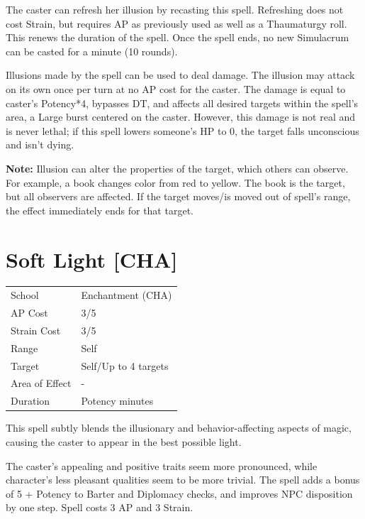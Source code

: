 \documentclass[11pt,a4paper,twocolumn]{book}
\begin{document}
The caster can refresh her illusion by recasting this spell. Refreshing does not cost Strain, but requires AP as previously used as well as a Thaumaturgy roll. This renews the duration of the spell. Once the spell ends, no new Simulacrum can be casted for a minute (10 rounds).

Illusions made by the spell can be used to deal damage. The illusion may attack on its own once per turn at no AP cost for the caster. The damage is equal to caster's Potency*4, bypasses DT, and affects all desired targets within the spell's area, a Large burst centered on the caster. However, this damage is not real and is never lethal; if this spell lowers someone's HP to 0, the target falls unconscious and isn't dying.

\textbf{Note:} Illusion can alter the properties of the target, which others can observe. For example, a book changes color from red to yellow. The book is the target, but all observers are affected. If the target moves/is moved out of spell's range, the effect immediately ends for that target.


\section*{Soft Light [CHA]}
{
	\begin{tabu} to 75mm{| X[l,4] | X[l,7] |}
		\hline
		School 			& Enchantment (CHA) 	\\
        AP Cost	      	& 3/5 					\\
        Strain Cost     & 3/5 					\\
        Range     		& Self					\\
        Target      	& Self/Up to 4 targets	\\
        Area of Effect  & -	 					\\
        Duration     	& Potency minutes		\\ \hline
	\end{tabu}
		
}

\medskip
 
This spell subtly blends the illusionary and behavior-affecting aspects of magic, causing the caster to appear in the best possible light.
 
The caster's appealing and positive traits seem more pronounced, while character's less pleasant qualities seem to be more trivial. The spell adds a bonus of 5 + Potency to Barter and Diplomacy checks, and improves NPC disposition by one step. Spell costs 3 AP and 3 Strain.
\end{document}
